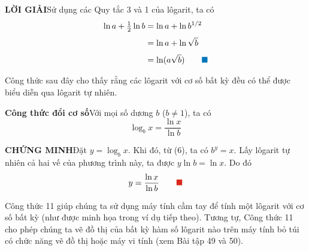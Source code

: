 \begin{minipage}[t]{0.71\textwidth}
\vspace{0.14cm}
\noindent\textbf{\textsf{\color{stewartcyan}LỜI GIẢI}}\quad Sử dụng các Quy tắc 3 và 1 của lôgarit, ta có
\begin{align*}
\ln a + \tfrac{1}{2}\ln b &= \ln a + \ln b^{1/2}\\[3pt]
&= \ln a + \ln\sqrt{b}\\[3pt]
&= \ln(a\sqrt{b})\tag*{\color{stewartcyan}$\blacksquare$}
\end{align*}

\vspace{0.16cm}
Công thức sau đây cho thấy rằng các lôgarit với cơ số bất kỳ đều có thể được biểu diễn qua lôgarit tự nhiên.

\vspace{0.25cm}
\begin{tcolorbox}[colback=white, colframe=stewartred, arc=1.5mm, boxrule=0.8pt, left=10pt, right=10pt, top=7pt, bottom=7pt]
\;\textbf{\textsf{\color{stewartred}Công thức đổi cơ số}}\quad Với mọi số dương $b$ ($b \ne 1$), ta có
\[
\log_b x = \frac{\ln x}{\ln b}
\]
\end{tcolorbox}

\vspace{0.18cm}
\noindent\textbf{\textsf{\color{stewartred}CHỨNG MINH}}\quad Đặt $y = \log_b x$. Khi đó, từ (6), ta có $b^y = x$. Lấy lôgarit tự nhiên cả hai vế của phương trình này, ta được $y\ln b = \ln x$. Do đó
\[
y = \frac{\ln x}{\ln b}\tag*{\color{stewartred}$\blacksquare$}
\]

\vspace{0.16cm}
Công thức 11 giúp chúng ta sử dụng máy tính cầm tay để tính một lôgarit với cơ số bất kỳ (như được minh họa trong ví dụ tiếp theo). Tương tự, Công thức 11 cho phép chúng ta vẽ đồ thị của bất kỳ hàm số lôgarit nào trên máy tính bỏ túi có chức năng vẽ đồ thị hoặc máy vi tính (xem Bài tập 49 và 50).
\end{minipage}